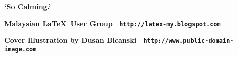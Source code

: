 \cleartoverso


\enlargethispage{3\baselineskip}
\thispagestyle{empty}
\pagecolor[HTML]{0E0407}

\begin{center}
\begin{minipage}{.8\textwidth}
\color{Cornsilk}\Large\bfseries
\lipsum[1]

\begin{center}
\huge\bfseries\sffamily\color{lime}`So Calming.'
\end{center}

\lipsum[2]

\end{minipage}
\end{center}


\begin{center}
\colorbox{white}{\EANisbn[SC4]}

\vspace*{\baselineskip}

\textbf{\textcolor{LightGoldenrod!50!Gold}{Malaysian \LaTeX\ User Group \textbullet\ \texttt{http://latex-my.blogspot.com}}}

\vspace*{\baselineskip}

\textbf{\textcolor{LightGoldenrod}{Cover Illustration by Dusan Bicanski \textbullet\ \texttt{http://www.public-domain-image.com}}}
\end{center}